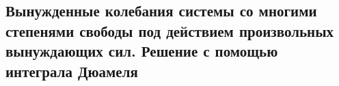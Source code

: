 

\subsection{Вынужденные колебания системы со многими степенями свободы под действием произвольных вынуждающих сил. Решение с помощью интеграла Дюамеля}



